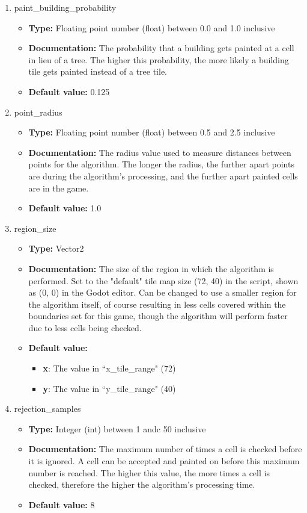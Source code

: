\begin{enumerate}
    \item paint\_building\_probability
    \begin{itemize}
        \item \textbf{Type:} Floating point number (float) between 0.0 and 1.0 inclusive
        \item \textbf{Documentation:} The probability that a building gets painted at a cell in lieu of a tree. The higher this probability, the more likely a building tile gets painted instead of a tree tile. 
        \item \textbf{Default value:} 0.125
    \end{itemize}
    \item point\_radius
    \begin{itemize}
        \item \textbf{Type:} Floating point number (float) between 0.5 and 2.5 inclusive
        \item \textbf{Documentation:} The radius value used to measure distances between points for the algorithm. The longer the radius, the further apart points are during the algorithm's processing, and the further apart painted cells are in the game.
        \item \textbf{Default value:} 1.0
    \end{itemize}
    \item region\_size
    \begin{itemize}
        \item \textbf{Type:} Vector2
        \item \textbf{Documentation:} The size of the region in which the algorithm is performed. Set to the "default" tile map size (72, 40) in the script, shown as (0, 0) in the Godot editor. Can be changed to use a smaller region for the algorithm itself, of course resulting in less cells covered within the boundaries set for this game, though the algorithm will perform faster due to less cells being checked.
        \item \textbf{Default value:} 
        \begin{itemize}
            \item \textbf{x}: The value in ``x\_tile\_range" (72)
            \item \textbf{y}: The value in ``y\_tile\_range" (40)
        \end{itemize}
    \end{itemize}
    \item rejection\_samples
    \begin{itemize}
        \item \textbf{Type:} Integer (int) between 1 andc 50 inclusive
        \item \textbf{Documentation:} The maximum number of times a cell is checked before it is ignored. A cell can be accepted and painted on before this maximum number is reached. The higher this value, the more times a cell is checked, therefore the higher the algorithm's processing time.
        \item \textbf{Default value:} 8
    \end{itemize}
\end{enumerate}

